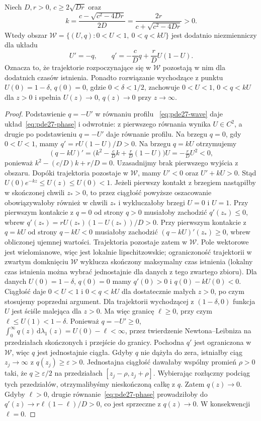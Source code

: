 \begin{lemat}
\label{lem:pde27-wedge}
Niech $D,r>0$, $c\ge2\sqrt{Dr}$ oraz
\[
 k=\frac{c-\sqrt{c^2-4Dr}}{2D}
   =\frac{2r}{c+\sqrt{c^2-4Dr}}>0.
\]
Wtedy obszar
$\mathcal W=\{(U,q):0<U<1,\ 0<q<kU\}$
jest dodatnio niezmienniczy dla układu
\begin{equation}\label{eq:pde27-phase}
 U'=-q,\qquad q'=-\frac cD q+\frac rD U(1-U).
\end{equation}
Oznacza to, że trajektorie rozpoczynające się w $\mathcal W$
pozostają w nim dla dodatnich czasów istnienia.
Ponadto rozwiązanie wychodzące z punktu
$U(0)=1-\delta$, $q(0)=0$, gdzie $0<\delta<1/2$,
zachowuje $0<U<1$, $0<q<kU$ dla $z>0$ i
spełnia $U(z)\to0$, $q(z)\to0$ przy $z\to\infty$.
\end{lemat}
\begin{proof}
Podstawienie $q=-U'$ w równaniu profilu
~\eqref{eq:pde27-wave} daje układ~\eqref{eq:pde27-phase}
i odwrotnie: z pierwszego równania wynika
$U\in C^2$, a drugie po podstawieniu $q=-U'$
daje równanie profilu.
Na brzegu $q=0$, gdy $0<U<1$, mamy
$q'=rU(1-U)/D>0$. Na brzegu $q=kU$ otrzymujemy
\[
 (q-kU)'=\bigl(k^2-\tfrac cDk+\tfrac rD(1-U)\bigr)U
 =-\tfrac rD U^2<0,
\]
ponieważ $k^2-(c/D)k+r/D=0$.
Uzasadnijmy brak pierwszego wyjścia z obszaru.
Dopóki trajektoria pozostaje w $\mathcal W$, mamy
$U'<0$ oraz $U'+kU>0$. Stąd
$U(0)e^{-kz}\le U(z)\le U(0)<1$.
Jeżeli pierwszy kontakt z brzegiem nastąpiłby
w skończonej chwili $z_*>0$, to przez ciągłość
powyższe oszacowanie obowiązywałoby również
w chwili $z_*$ i
wykluczałoby brzegi $U=0$ i $U=1$.
Przy pierwszym kontakcie z $q=0$ od strony $q>0$
musiałoby zachodzić $q'(z_*)\le0$, wbrew
$q'(z_*)=rU(z_*)(1-U(z_*))/D>0$.
Przy pierwszym kontakcie z $q=kU$ od strony $q-kU<0$
musiałoby zachodzić $(q-kU)'(z_*)\ge0$, wbrew
obliczonej ujemnej wartości.
Trajektoria pozostaje zatem w $\mathcal W$.
Pole wektorowe jest wielomianowe, więc jest lokalnie
lipschitzowskie; ograniczoność trajektorii w zwartym
domknięciu $\mathcal W$ wyklucza skończony maksymalny
czas istnienia (lokalny czas istnienia można wybrać
jednostajnie dla danych z tego zwartego zbioru).
Dla danych $U(0)=1-\delta$, $q(0)=0$ mamy
$q'(0)>0$ i $q(0)-kU(0)<0$. Ciągłość daje
$0<U<1$ i $0<q<kU$ dla dostatecznie małych $z>0$,
po czym stosujemy poprzedni argument.
Dla trajektorii wychodzącej z $(1-\delta,0)$
funkcja $U$ jest ściśle malejąca dla $z>0$.
Ma więc granicę $\ell\ge0$, przy czym
$\ell\le U(1)<1-\delta$. Ponieważ $q=-U'\ge0$,
$\int_0^\infty q(z)\,\mathrm d\lambda_1(z)
=U(0)-\ell<\infty$, przez twierdzenie Newtona--Leibniza
na przedziałach skończonych i przejście do granicy.
Pochodna $q'$ jest ograniczona w $\mathcal W$,
więc $q$ jest jednostajnie ciągła.
Gdyby $q$ nie dążyła do zera, istniałby ciąg
$z_j\to\infty$ z $q(z_j)\ge\varepsilon>0$.
Jednostajna ciągłość dawałaby wspólny promień $\rho>0$
taki, że $q\ge\varepsilon/2$ na przedziałach
$[z_j-\rho,z_j+\rho]$. Wybierając rozłączny
podciąg tych przedziałów, otrzymalibyśmy nieskończoną
całkę z $q$. Zatem $q(z)\to0$. Gdyby $\ell>0$, drugie
równanie~\eqref{eq:pde27-phase} prowadziłoby do
$q'(z)\to r\ell(1-\ell)/D>0$, co jest sprzeczne
z $q(z)\to0$. W konsekwencji $\ell=0$.
\end{proof}

